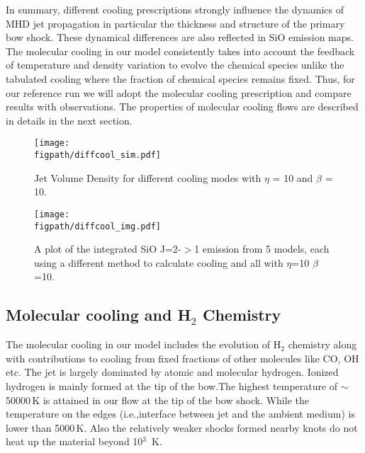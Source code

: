 \documentclass[useAMS,usenatbib]{mn2e}
\newcommand{\figpath}{/Users/bhargavvaidya/MyProject/work/Leeds_Uni/SiOJets_New/PAPER/PFIGS/}
\begin{document}
In summary, different cooling prescriptions strongly influence the
dynamics of MHD jet propagation in particular the thickness and
structure of the primary bow shock. These dynamical differences are
also reflected in SiO emission maps. The molecular cooling in our
model consistently takes into account the feedback of temperature and
density variation to evolve the chemical species unlike the tabulated cooling
where the fraction of chemical species remains fixed. Thus, for our reference
run we will adopt the molecular cooling prescription and compare
results with observations. The properties of
molecular cooling flows are described in details in the next section.

\begin{figure*}
 \texttt{[image: \\figpath/diffcool\_sim.pdf]}%
 \caption{Jet Volume Density for different cooling modes with
   $\eta$ = 10 and $\beta$ = 10.}
\label{fig:coolcmpdyn}
\end{figure*}

\begin{figure*}
 \texttt{[image: \\figpath/diffcool\_img.pdf]}
 \caption{A plot of the integrated SiO J=2-$>$1 emission from 5 models, 
each using a different method to calculate cooling and all with $\eta$=10 $\beta$=10.}
\label{fig:coolcmpsio} 
\end{figure*}



\subsection{Molecular cooling and H$_2$ Chemistry}
The molecular cooling in our
model includes the evolution of H$_2$ chemistry along with
contributions to cooling from fixed fractions of other molecules like
CO, OH etc. The jet is largely dominated by atomic
and molecular hydrogen. Ionized hydrogen is mainly formed at the tip
of the bow.The
highest temperature of $\sim$ 50000\,K is attained in our flow at the
tip of the bow shock. While the temperature on the edges (i.e.,interface between
jet and the ambient medium) is lower than 5000\,K. Also the relatively
weaker shocks formed nearby knots do not heat up the material beyond
10$^{3}$\, K.
%
\end{document}
